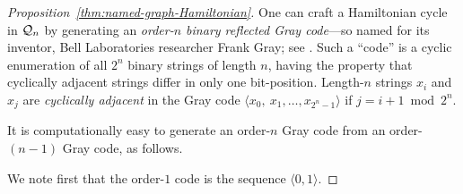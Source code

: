 \begin{proof}[Proposition~\ref{thm:named-graph-Hamiltonian}]
\medskip

  
One can craft a Hamiltonian cycle in $\mbox{$\cal Q$}_n$ by generating an
{\it order-$n$ binary reflected Gray code}---so named
for its inventor, Bell Laboratories researcher Frank Gray; see \cite{PetersonW81}.   
Such a ``code'' is a cyclic enumeration of all $2^n$ binary strings of length $n$, having 
the property that cyclically adjacent strings differ in only one bit-position.  Length-$n$ 
strings $x_i$ and $x_j$ are {\it cyclically adjacent} in the Gray code
$\langle x_0, \ x_1, \ldots, x_{2^n-1} \rangle$ if $j = i+1 \bmod 2^n$.

\noindent
It is computationally easy to generate an order-$n$ Gray code from an
order-$(n-1)$ Gray code, as follows.

We note first that the order-$1$ code is the sequence $\langle 0, 1 \rangle$.


\end{proof}
